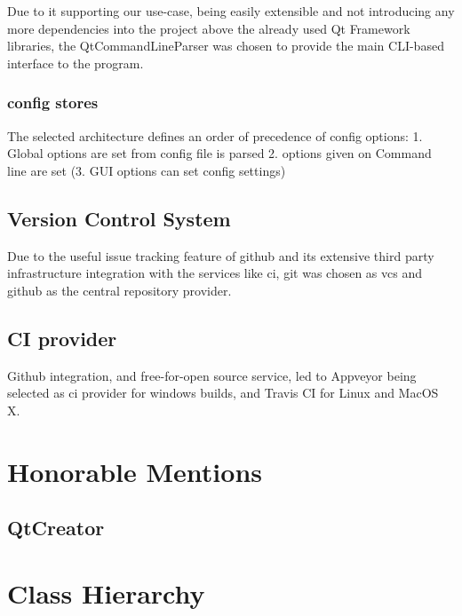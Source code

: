 Due to it supporting our use-case, being easily extensible and not introducing any more dependencies into the project above the already used Qt Framework libraries, the QtCommandLineParser was chosen to provide the main CLI-based interface to the program.
\subsubsection{config stores}
The selected architecture defines an order of precedence of config options:
1. Global options are set from config file is parsed
2. options given on Command line are set 
(3. GUI options can set config settings)

\subsection{Version Control System}
Due to the useful issue tracking feature of github and its extensive third party infrastructure integration with the services like \gls{ci}, git was chosen as \gls{vcs} and github as the central repository provider.

\subsection{CI provider}
Github integration, and free-for-open source service, led to Appveyor being selected as \gls{ci} provider for windows builds, and Travis CI for Linux and MacOS X.

\section{Honorable Mentions}
\subsection{QtCreator}

\section{Class Hierarchy}
\begin{figure}[p]
\end{figure}
